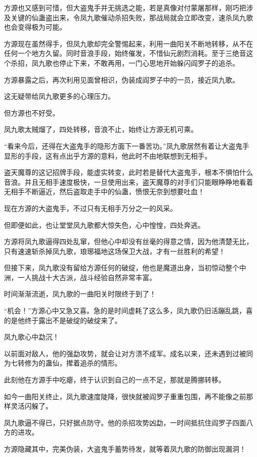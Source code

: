 \begin{this_body}
方源也又感到可惜，但大盗鬼手并无挑选之能，若是真像对付蒙屠那样，刚巧把涉及关键的仙蛊盗出来，令凤九歌催动杀招失败，那战局就会立即改变，速杀凤九歌也会变得极为可能。

方源现在虽然得手，但凤九歌却完全警惕起来，利用一曲阳关不断地转移，从不在任何一个地方久留。同时音浪手段，始终催发，不惜仙元剧烈消耗。至于三绝音这个杀招，凤九歌也停止下来，不敢再用，一门心思地开始躲闪阎罗子的追杀。

方源暴露之后，再次利用见面曾相识，伪装成阎罗子中的一员，接近凤九歌。

这无疑带给凤九歌更多的心理压力。

但方源也不好受。

凤九歌太贼熘了，四处转移，音浪不止，始终让方源无机可乘。

“看来今后，还得在大盗鬼手的隐形方面下一番苦功。”凤九歌居然有着让大盗鬼手显形的手段，这有点出乎方源的意料，他此时不由地联想到无相手。

盗天魔尊的这记招牌手段，能虚实转变，此时若是替代大盗鬼手，根本不惧怕什么音浪。并且无相手速度极快，一旦使用出来，盗天魔尊的对手们只能眼睁睁地看着无相手不断逼近，然后盗取走手中的仙蛊，愤恨无奈到想要吐血！

现在方源的大盗鬼手，不过只有无相手万分之一的风采。

但即便如此，也让堂堂凤九歌都大惊失色，心中惶惶，四处奔逃。

方源将凤九歌逼得四处乱窜，但他心中却没有丝毫的得意之情，因为他清楚无比，只有速速斩杀掉凤九歌，琅琊福地这场保卫大战，才有一丝胜利的希望！

但接下来，凤九歌没有留给方源任何的破绽，他也是魔道出身，当初惊动整个中洲，一人挑战十大古派，战斗经验自然非常丰富。

时间渐渐流逝，凤九歌的一曲阳关时限终于到了！

“机会！”方源心中又急又喜。急的是时间虚耗了这么多，凤九歌仍旧活蹦乱跳，喜的是他终于露出不是破绽的破绽来了。

凤九歌心中勐沉！

以前面对敌人，他的强勐攻势，就会让对方溃不成军。成名以来，还未遇到过被同为七转修为的蛊仙，撵着追杀的情形。

此刻他在方源手中吃瘪，终于认识到自己的一点不足，那就是腾挪转移。

如今一曲阳关终止，凤九歌速度陡降，很快就被阎罗子重重包围，再不能像之前那样灵活闪躲了。

凤九歌逼不得已，只好据点防守。他的杀招攻势凶勐，一时间抵抗住阎罗子四面八方的进攻。

方源隐藏其中，完美伪装，大盗鬼手蓄势待发，就等着凤九歌的防御出现漏洞！


\end{this_body}
